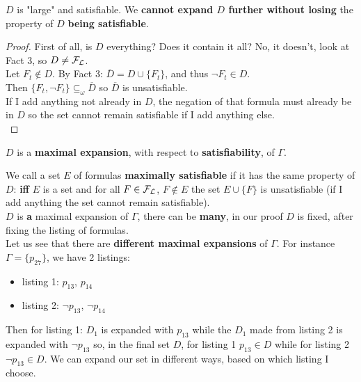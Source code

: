 	$D$ is "large" and satisfiable. We \textbf{cannot expand $D$ further without losing} the property of $D$ \textbf{being satisfiable}.\\

	\begin{proof}
		First of all, is $D$ everything? Does it contain it all? No, it doesn't, look at Fact 3, so $D \neq \mathcal{F}_\mathcal{L}$. \\

		Let $F_t \notin D$. By Fact 3: $\overline{D} = D \cup \{F_t\}$, and thus $\neg F_t \in D$. \\
		Then $\{F_t, \neg F_t\} \subseteq_\omega \overline{D}$ so $\overline{D}$ is unsatisfiable.\\
		If I add anything not already in $D$, the negation of that formula must already be in $D$ so the set cannot remain satisfiable if I add anything else.\\
	\end{proof}

	$D$ is a \textbf{maximal expansion}, with respect to \textbf{satisfiability}, of $\Gamma$.\\

	\newpage

	We call a set $E$ of formulas \textbf{maximally satisfiable} if it has the same property of $D$: \textbf{iff} $E$ is a set and for all $F \in \mathcal{F}_\mathcal{L}$, $F \notin E$ the set $E \cup \{F\}$ is unsatisfiable (if I add anything the set cannot remain satisfiable).\\

	$D$ is \textbf{a} maximal expansion of $\Gamma$, there can be \textbf{many}, in our proof $D$ is fixed, after fixing the listing of formulas.\\

	Let us see that there are \textbf{different maximal expansions} of $\Gamma$. For instance $\Gamma = \{p_{27}\}$, we have 2 listings:
	\begin{itemize}
		\item listing 1: $p_{13}$, $p_{14}$
		\item listing 2: $\neg p_{13}$, $\neg p_{14}$
	\end{itemize}

	Then for listing 1: $D_1$ is expanded with $p_{13}$ while the $D_1$ made from listing 2 is expanded with $\neg p_{13}$ so, in the final set $D$, for listing 1 $p_{13} \in D$ while for listing 2 $\neg p_{13} \in D$. We can expand our set in different ways, based on which listing I choose.\\


